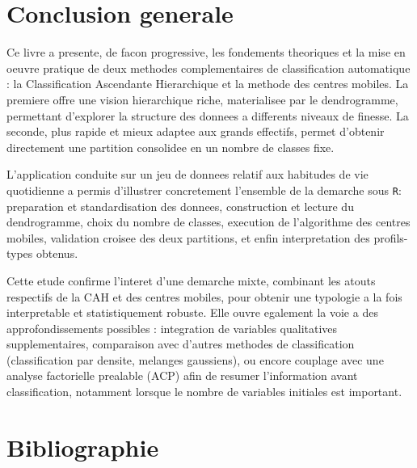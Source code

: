 \documentclass[12pt,a4paper]{book}
\newcommand{\R}{\texttt{R}}
\begin{document}
	\newpage
	
	\chapter*{Conclusion generale}
	
	Ce livre a presente, de facon progressive, les fondements theoriques et la mise en oeuvre pratique de deux methodes complementaires de classification automatique : la Classification Ascendante Hierarchique et la methode des centres mobiles. La premiere offre une vision hierarchique riche, materialisee par le dendrogramme, permettant d'explorer la structure des donnees a differents niveaux de finesse. La seconde, plus rapide et mieux adaptee aux grands effectifs, permet d'obtenir directement une partition consolidee en un nombre de classes fixe.
	
	L'application conduite sur un jeu de donnees relatif aux habitudes de vie quotidienne a permis d'illustrer concretement l'ensemble de la demarche sous \R : preparation et standardisation des donnees, construction et lecture du dendrogramme, choix du nombre de classes, execution de l'algorithme des centres mobiles, validation croisee des deux partitions, et enfin interpretation des profils-types obtenus.
	
	Cette etude confirme l'interet d'une demarche mixte, combinant les atouts respectifs de la CAH et des centres mobiles, pour obtenir une typologie a la fois interpretable et statistiquement robuste. Elle ouvre egalement la voie a des approfondissements possibles : integration de variables qualitatives supplementaires, comparaison avec d'autres methodes de classification (classification par densite, melanges gaussiens), ou encore couplage avec une analyse factorielle prealable (ACP) afin de resumer l'information avant classification, notamment lorsque le nombre de variables initiales est important.
	
	\newpage
	
	\chapter*{Bibliographie}
	
\end{document}
